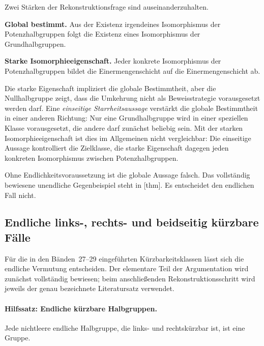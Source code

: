 \documentclass[main.tex]{subfiles}
\begin{document}
Zwei Stärken der Rekonstruktionsfrage sind auseinanderzuhalten.

\smallskip
\noindent\textbf{Global bestimmt.}
Aus der Existenz irgendeines Isomorphismus der Potenzhalbgruppen folgt die
Existenz eines Isomorphismus der Grundhalbgruppen.

\smallskip
\noindent\textbf{Starke Isomorphieeigenschaft.}
Jeder konkrete Isomorphismus der Potenzhalbgruppen bildet die
Einermengenschicht auf die Einermengenschicht ab.

\smallskip
Die starke Eigenschaft impliziert die globale Bestimmtheit, aber die
Nullhalbgruppe zeigt, dass die Umkehrung nicht als Beweisstrategie vorausgesetzt
werden darf.  Eine \emph{einseitige Starrheitsaussage} verstärkt die globale
Bestimmtheit in einer anderen Richtung: Nur eine Grundhalbgruppe wird in
einer speziellen Klasse vorausgesetzt, die andere darf zunächst beliebig
sein.  Mit der starken Isomorphieeigenschaft ist dies im Allgemeinen nicht
vergleichbar: Die einseitige Aussage kontrolliert die Zielklasse, die starke
Eigenschaft dagegen jeden konkreten Isomorphismus zwischen
Potenzhalbgruppen.

Ohne Endlichkeitsvoraussetzung ist die globale Aussage falsch.  Das
vollständig bewiesene unendliche Gegenbeispiel steht in
[thm].  Es entscheidet den
endlichen Fall nicht.

\subsection{Endliche links-, rechts- und beidseitig kürzbare Fälle}

Für die in den Bänden~27--29 eingeführten Kürzbarkeitsklassen lässt sich die
endliche Vermutung entscheiden.  Der elementare Teil der Argumentation wird
zunächst vollständig bewiesen; beim anschließenden Rekonstruktionsschritt
wird jeweils der genau bezeichnete Literatursatz verwendet.

\paragraph{Hilfssatz: Endliche kürzbare Halbgruppen.}
Jede nichtleere endliche Halbgruppe, die links- und rechtskürzbar ist, ist
eine Gruppe.
\end{document}
